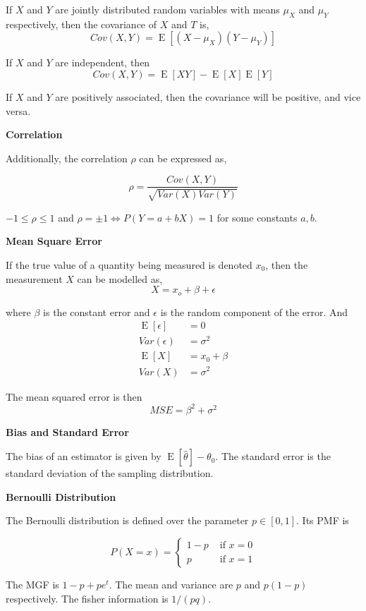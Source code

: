 \documentclass[a4paper]{article}
\newcommand{\subheading}[1]{{\scriptsize\textbf{#1}}}
\newcommand{\expectation}[1]{\operatorname{E}[#1]}
\begin{document}
\begin{multicols*}{4}
If $X$ and $Y$ are jointly distributed random variables with means $\mu_X$ and
$\mu_Y$ respectively, then the covariance of $X$ and $T$ is,
$$Cov(X, Y) = \expectation{(X-\mu_X)(Y-\mu_Y)}$$

If $X$ and $Y$ are independent, then
$$Cov(X, Y) = \expectation{XY} - \expectation{X}\expectation{Y}$$

If $X$ and $Y$ are positively associated, then the covariance will be positive,
and vice versa. \smallskip

\subheading{Correlation}

Additionally, the correlation $\rho$ can be expressed as,

$$\rho = \frac{Cov(X, Y)}{\sqrt{Var(X)Var(Y)}}$$

$-1 \leq \rho \leq 1$ and $\rho = \pm 1 \iff P(Y = a + bX) = 1$ for some
constants $a, b$. \smallskip

\subheading{Mean Square Error}

If the true value of a quantity being measured is denoted $x_0$, then the
measurement $X$ can be modelled as,
$$X = x_o + \beta + \epsilon$$

where $\beta$ is the constant error and $\epsilon$ is the random component of
the error. And
\begin{align*}
  \expectation{\epsilon} &= 0 \\
  Var(\epsilon) &= \sigma^2 \\
  \expectation{X} &= x_0 + \beta \\
  Var(X) &= \sigma^2
\end{align*}

The mean squared error is then
$$MSE = \beta^2 + \sigma^2$$

\subheading{Bias and Standard Error}

The bias of an estimator is given by $\expectation{\hat{\theta}} - \theta_0$.
The standard error is the standard deviation of the sampling distribution.
\smallskip

\subheading{Bernoulli Distribution}

The Bernoulli distribution is defined over the parameter $p \in [0, 1]$. Its PMF
is

$$P(X = x) = \begin{cases}
  1-p & \text{ if $x = 0$} \\
  p   & \text{ if $x = 1$}
\end{cases}$$

The MGF is $1-p + pe^t$. The mean and variance are $p$ and $p(1-p)$
respectively. The fisher information is $1/(pq)$. \smallskip


\end{multicols*}
\end{document}
